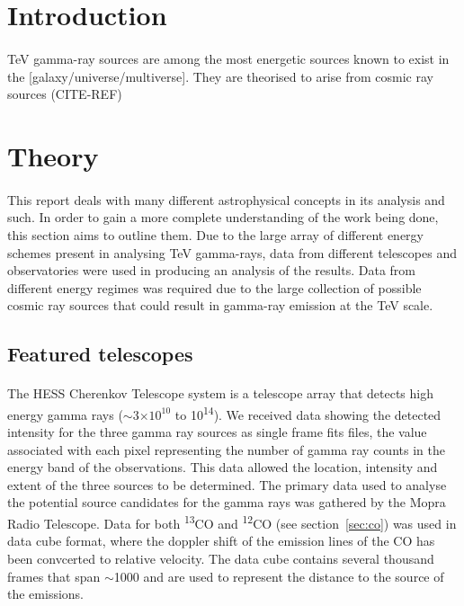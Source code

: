 \documentclass[a4paper, titlepage, oneside]{article}
\newcommand{\elem}[2]{\textsuperscript{#1}{#2}}
\newcommand{\e}[1]{\ensuremath{\times 10^{#1}}}
\begin{document}
\begin{multicols}{2}
\section{Introduction} %
\paragraph{}
TeV gamma-ray sources are among the most energetic sources known to exist in the [galaxy/universe/multiverse]. They are theorised to arise from cosmic ray sources (CITE-REF)

\section{Theory} %
\paragraph{}
This report deals with many different astrophysical concepts in its analysis and such. In order to gain a more complete understanding of the work being done, this section aims to outline them. Due to the large array of different energy schemes present in analysing TeV gamma-rays, data from different telescopes and observatories were used in producing an analysis of the results. Data from different energy regimes was required due to the large collection of possible cosmic ray sources that could result in gamma-ray emission at the TeV scale. 

\subsection{Featured telescopes}
\paragraph{}
The HESS Cherenkov Telescope system is a telescope array that detects high energy gamma rays (\(\sim\)\(3\e{10}\) to \unit{10^{14}}{\electronvolt}). We received data showing the detected intensity for the three gamma ray sources as single frame fits files, the value associated with each pixel representing the number of gamma ray counts in the energy band of the observations. This data allowed the location, intensity and extent of the three sources to be determined. The primary data used to analyse the potential source candidates for the gamma rays was gathered by the Mopra Radio Telescope. Data for both \elem{13}{C}O and \elem{12}{C}O (see section~\ref{sec:co}) was used in data cube format, where the doppler shift of the emission lines of the CO has been convcerted to relative velocity. The data cube contains several thousand frames that span \(\sim\)\unit{1000}{\kilo\meter\cdot\reciprocal\second} and are used to represent the distance to the source of the emissions.


\end{multicols}
\end{document}
